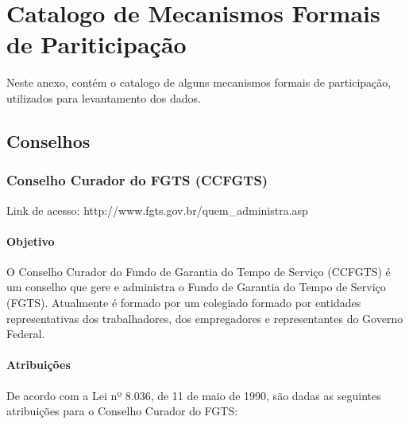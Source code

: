\chapter{Catalogo de Mecanismos Formais de Pariticipação}
\label{Att:catalogomecanismos}

Neste anexo, contém o catalogo de alguns mecanismos formais de participação, utilizados para levantamento dos dados.

\section*{Conselhos}

\subsection*{Conselho Curador do FGTS (CCFGTS)}

Link de acesso: http://www.fgts.gov.br/quem\_administra.asp

\subsubsection*{Objetivo}

O Conselho Curador do Fundo de Garantia do Tempo de Serviço (CCFGTS) é um conselho que gere e administra o Fundo de Garantia do Tempo de Serviço (FGTS). Atualmente é formado por um colegiado formado por entidades representativas dos trabalhadores, dos empregadores e representantes do Governo Federal.

\subsubsection*{Atribuições}

De acordo com a Lei nº 8.036, de 11 de maio de 1990,
são dadas as seguintes atribuições para o Conselho Curador do
FGTS:

